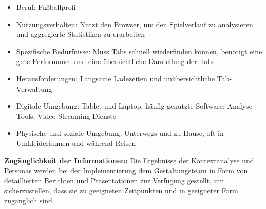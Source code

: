\begin{enumerate}
\begin{itemize}
        \item Beruf: Fußballprofi
        \item Nutzungsverhalten: Nutzt den Browser, um den Spielverlauf zu analysieren und aggregierte Statistiken zu erarbeiten
        \item Spezifische Bedürfnisse: Muss Tabs schnell wiederfinden können, benötigt eine gute Performance und eine übersichtliche Darstellung der Tabs
        \item Herausforderungen: Langsame Ladezeiten und unübersichtliche Tab-Verwaltung
        \item Digitale Umgebung: Tablet und Laptop, häufig genutzte Software: Analyse-Tools, Video-Streaming-Dienste
        \item Physische und soziale Umgebung: Unterwegs und zu Hause, oft in Umkleideräumen und während Reisen
    \end{itemize}
\end{enumerate}

\textbf{Zugänglichkeit der Informationen:}
Die Ergebnisse der Kontextanalyse und Personas werden bei der Implementierung dem Gestaltungsteam in Form von detaillierten Berichten und Präsentationen zur Verfügung gestellt, um sicherzustellen, dass sie zu geeigneten Zeitpunkten und in geeigneter Form zugänglich sind.


